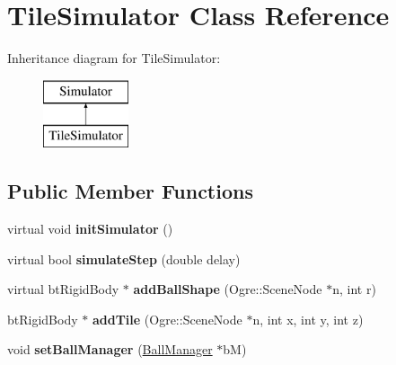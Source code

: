 \hypertarget{classTileSimulator}{\section{Tile\-Simulator Class Reference}
\label{classTileSimulator}
}
Inheritance diagram for Tile\-Simulator\-:\begin{figure}[H]
\begin{center}
\leavevmode
\includegraphics[height=2.000000cm]{classTileSimulator}
\end{center}
\end{figure}
\subsection*{Public Member Functions}
\begin{DoxyCompactItemize}
\item 
\hypertarget{classTileSimulator_a952f2493568e720f37331119084f9dd3}{virtual void {\bfseries init\-Simulator} ()}\label{classTileSimulator_a952f2493568e720f37331119084f9dd3}

\item 
\hypertarget{classTileSimulator_ae944141e1051b803018d6c4af47f2df9}{virtual bool {\bfseries simulate\-Step} (double delay)}\label{classTileSimulator_ae944141e1051b803018d6c4af47f2df9}

\item 
\hypertarget{classTileSimulator_ad1db783060a2d2af92e614042cab0767}{virtual bt\-Rigid\-Body $\ast$ {\bfseries add\-Ball\-Shape} (Ogre\-::\-Scene\-Node $\ast$n, int r)}\label{classTileSimulator_ad1db783060a2d2af92e614042cab0767}

\item 
\hypertarget{classTileSimulator_af5290bb6e13b9c9dccced4d275b7cac7}{bt\-Rigid\-Body $\ast$ {\bfseries add\-Tile} (Ogre\-::\-Scene\-Node $\ast$n, int x, int y, int z)}\label{classTileSimulator_af5290bb6e13b9c9dccced4d275b7cac7}

\item 
\hypertarget{classTileSimulator_a6c90f655f570b9c80642007c6c97f1aa}{void {\bfseries set\-Ball\-Manager} (\hyperlink{classBallManager}{Ball\-Manager} $\ast$b\-M)}\label{classTileSimulator_a6c90f655f570b9c80642007c6c97f1aa}

\end{DoxyCompactItemize}
